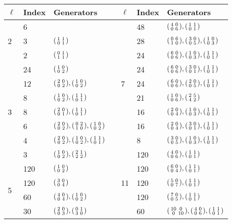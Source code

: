 \documentclass[table,dvipsnames]{amsart}
\newcommand{\smallmat}[4]{\begin{psmallmatrix}#1&#2\\#3&#4\end{psmallmatrix}}
\numberwithin{equation}{section}
\begin{document}
\begin{table}
\begin{tabular}{lllclll}
\toprule
$\ell$&Index&Generators&\qquad\qquad&$\ell$&Index&Generators\\
\midrule
\multirow{3}{*}{2} & 6 & $ $ & & \multirow{9}{*}{7} & 48 & $\smallmat{4}{0}{0}{6},\smallmat{1}{1}{0}{1}$ \\
 & 3 & $\smallmat{1}{1}{0}{1}$ & &  & 28 & $\smallmat{0}{6}{1}{0},\smallmat{3}{0}{0}{5},\smallmat{1}{0}{0}{3}$ \\
 & 2 & $\smallmat{0}{1}{1}{1}$ & &  & 24 & $\smallmat{6}{0}{0}{6},\smallmat{1}{0}{0}{3},\smallmat{1}{1}{0}{1}$ \\\cmidrule{1-3}
\multirow{7}{*}{3} & 24 & $\smallmat{1}{0}{0}{2}$ & & & 24 & $\smallmat{6}{0}{0}{6},\smallmat{3}{0}{0}{1},\smallmat{1}{1}{0}{1}$ \\
 & 12 & $\smallmat{2}{0}{0}{2},\smallmat{1}{0}{0}{2}$ & &  & 24 & $\smallmat{6}{0}{0}{6},\smallmat{2}{0}{0}{5},\smallmat{1}{1}{0}{1}$ \\
& 8 & $\smallmat{1}{0}{0}{2},\smallmat{1}{1}{0}{1}$ & & & 21 & $\smallmat{1}{0}{0}{6},\smallmat{2}{5}{4}{2}$ \\
 & 8 & $\smallmat{2}{0}{0}{1},\smallmat{1}{1}{0}{1}$ & & & 16 & $\smallmat{2}{0}{0}{4},\smallmat{1}{0}{0}{3},\smallmat{1}{1}{0}{1}$ \\
 & 6 & $\smallmat{2}{0}{0}{2},\smallmat{0}{2}{1}{0},\smallmat{1}{0}{0}{2}$ & &  & 16 & $\smallmat{2}{0}{0}{4},\smallmat{3}{0}{0}{1},\smallmat{1}{1}{0}{1}$ \\
 & 4 & $\smallmat{2}{0}{0}{2},\smallmat{1}{0}{0}{2},\smallmat{1}{1}{0}{1}$ & &  & 8 & $\smallmat{3}{0}{0}{5},\smallmat{1}{0}{0}{3},\smallmat{1}{1}{0}{1}$ \\\cmidrule{5-7}
 & 3 & $\smallmat{1}{0}{0}{2},\smallmat{2}{1}{2}{2}$ & & \multirow{7}{*}{11} & 120 & $\smallmat{4}{0}{0}{6},\smallmat{1}{1}{0}{1}$ \\\cmidrule{1-3}
\multirow{15}{*}{5} & 120 & $\smallmat{1}{0}{0}{2}$ & & & 120 & $\smallmat{6}{0}{0}{4},\smallmat{1}{1}{0}{1}$ \\
 & 120 & $\smallmat{3}{0}{0}{4}$ & & & 120 & $\smallmat{5}{0}{0}{7},\smallmat{1}{1}{0}{1}$ \\
 & 60 & $\smallmat{4}{0}{0}{4},\smallmat{1}{0}{0}{2}$ & & & 120 & $\smallmat{7}{0}{0}{5},\smallmat{1}{1}{0}{1}$ \\
 & 30 & $\smallmat{2}{0}{0}{3},\smallmat{0}{1}{3}{0}$ & & & 60 & $\smallmat{10}{0}{0}{10},\smallmat{4}{0}{0}{6},\smallmat{1}{1}{0}{1}$ \\

\end{tabular}
\end{table}
\end{document}

